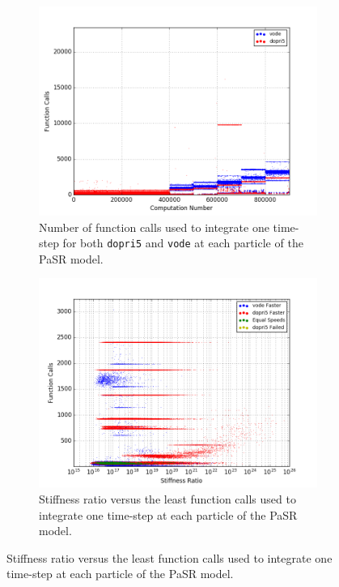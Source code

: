 \documentclass[12pt]{ussci}
\begin{document}
\begin{figure}[htbp]
    \centering
    \begin{subfigure}{0.43\textwidth}
        \includegraphics[width=\linewidth]{PaSR_Fn_Work_1e-06.png}
        \caption{Number of function calls used to integrate one time-step for both \texttt{dopri5} and \texttt{vode} at each particle of the PaSR model.}
        \label{fig:FWH2COPaSR}
    \end{subfigure}
    \hfill
    \begin{subfigure}{0.43\textwidth}
        \includegraphics[width=\linewidth]{PaSR_Fn_Work_Ratio_Groupings_1e-06.png}
        \caption{Stiffness ratio versus the least function calls used to integrate one time-step at each particle of the PaSR model.}

\end{subfigure}
\end{figure}
\end{document}
